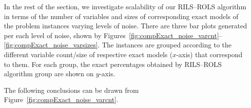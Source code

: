 \documentclass[a4paper,12pt]{elsarticle}
\begin{document}
\begin{center}
	\label{fig:compR2_noise_size}
\end{center}

In the rest of the section,  we investigate scalability of our \textsc{RILS}--\textsc{ROLS} algorithm in terms of the number of variables and sizes of corresponding exact models of the problem instances varying levels of noise. There are three bar plots generated per each level of noise, shown by Figures~\ref{fig:compExact_noise_varcnt}--\ref{fig:compExact_noise_varsizes}. The instances are grouped according to the different variable count/size of respective exact models ($x$-axis) that correspond to them. For each group, the exact percentages obtained by \textsc{RILS}--\textsc{ROLS} algorithm group are shown on $y$-axis.

The following conclusions can be drawn from Figure~\ref{fig:compExact_noise_varcnt}. 
\end{document}
